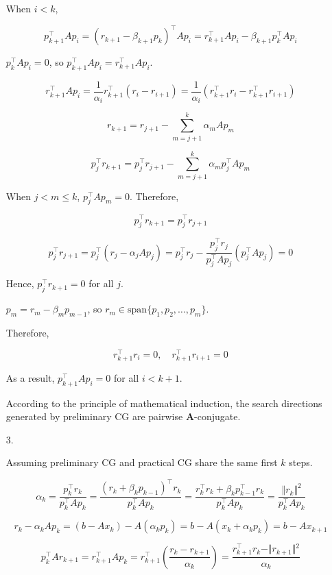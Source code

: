 \documentclass[11pt,a4paper]{article}
\begin{document}
\begin{enumerate}
    When $i < k$,

    $$
    p_{k+1}^\top A p_i
    = (r_{k+1} - \beta_{k+1} p_k)^\top A p_i
    = r_{k+1}^\top A p_i - \beta_{k+1} p_k^\top A p_i
    $$

    $p_k^\top A p_i = 0$, so $p_{k+1}^\top A p_i = r_{k+1}^\top A p_i$.

    $$
    r_{k+1}^\top A p_i = \frac{1}{\alpha_i} r_{k+1}^\top (r_i - r_{i+1}) = \frac{1}{\alpha_i} (r_{k+1}^\top r_i - r_{k+1}^\top r_{i+1})
    $$

    $$
    r_{k+1} = r_{j+1} - \sum_{m=j+1}^k \alpha_m A p_m
    $$

    $$
    p_j^\top r_{k+1} = p_j^\top r_{j+1} - \sum_{m=j+1}^k \alpha_m p_j^\top A p_m
    $$

    When $j < m \le k$, $p_j^\top A p_m = 0$. Therefore,

    $$
    p_j^\top r_{k+1} = p_j^\top r_{j+1}
    $$

    $$
    p_j^\top r_{j+1} = p_j^\top (r_j - \alpha_j A p_j) = p_j^\top r_j - \frac{p_j^\top r_j}{p_j^\top A p_j} (p_j^\top A p_j) = 0
    $$

    Hence, $p_j^\top r_{k+1} = 0$ for all $j$.

    $p_m = r_m - \beta_m p_{m-1}$, so $r_m \in \mathrm{span}\{p_1, p_2, \dots, p_m\}$.

    Therefore,

    $$
    r_{k+1}^\top r_i = 0,\quad r_{k+1}^\top r_{i+1} = 0
    $$

    As a result, $p_{k+1}^\top A p_i = 0$ for all $i < k+1$.

    According to the principle of mathematical induction, the search directions generated by preliminary CG are pairwise $\mathbf{A}$-conjugate.

    \item[3. ]
    
    Assuming preliminary CG and practical CG share the same first $k$ steps.

    $$
    \alpha_k
    = \frac{p_k^\top r_k}{p_k^\top A p_k}
    = \frac{(r_k + \beta_k p_{k-1})^\top r_k}{p_k^\top A p_k}
    = \frac{r_k^\top r_k + \beta_k p_{k-1}^\top r_k}{p_k^\top A p_k}
    = \frac{\Vert r_k \Vert ^2}{p_k^\top A p_k}
    $$

    $$
    r_k - \alpha_k A p_k = (b - A x_k) - A(\alpha_k p_k) = b - A(x_k + \alpha_k p_k) = b - A x_{k+1}
    $$

    $$
    p_k^\top Ar_{k+1} = r_{k+1}^\top Ap_k = r_{k+1}^\top \left( \frac{r_k - r_{k+1}}{\alpha_k} \right) = \frac{r_{k+1}^\top r_k - \Vert{}r_{k+1}\Vert{}^2}{\alpha_k}
    $$


\end{enumerate}
\end{document}
